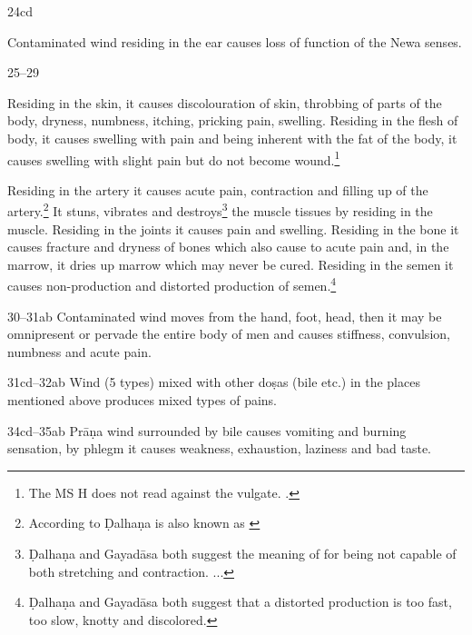 \begin{translation}
\item[24cd]

Contaminated wind residing in the ear causes loss of function of 
the Newa
senses.

\item[25--29] 

Residing in the skin, it causes discolouration of
    skin, throbbing of parts of the body, dryness, numbness, itching,
    pricking pain, swelling. Residing in the flesh of body, it causes
    swelling with pain and being inherent with the fat of the body, it causes
    swelling with slight pain but do not become wound.\footnote{The MS H
        does not read  against the vulgate. \citep[261]{vulgate}.}

Residing in the artery it causes acute pain, contraction and filling up of the 
artery.\footnote{According to Ḍalhaṇa  is also known as 
 \citep[262]{vulgate}} It stuns, vibrates and 
destroys\footnote{Ḍalhaṇa and Gayadāsa both suggest the meaning of 
 for being not capable of both stretching and contraction. 
\citep[262]{vulgate} 
...} 
the muscle tissues by residing in the muscle. Residing in the joints it causes 
pain 
and swelling. Residing in the bone it causes fracture and dryness of bones 
which 
also cause to acute pain and, in the marrow, it dries up marrow which may 
never 
be cured. Residing in the semen it causes non-production and distorted 
production of semen.\footnote{Ḍalhaṇa and Gayadāsa both suggest that a 
distorted production  is too fast, too slow, knotty and 
discolored.} 


\item[30--31ab] Contaminated wind moves from the hand, foot, head, then it 
may be omnipresent or pervade the entire body of men and causes stiffness, 
convulsion, numbness and acute pain.

\item[31cd--32ab] Wind (5 types) mixed with other doṣas (bile etc.) in the 
places mentioned above produces mixed types of pains.

\item[34cd--35ab] Prāṇa wind surrounded by bile causes vomiting and burning 
sensation, by phlegm it causes weakness, exhaustion, laziness and bad taste. 


\end{translation}
